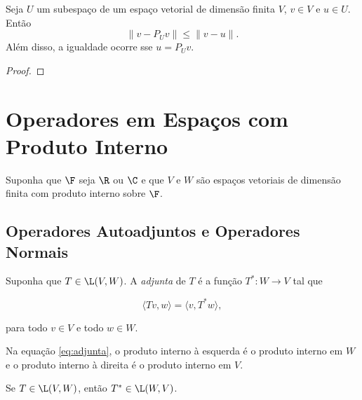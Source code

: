 \documentclass{article}
\begin{document}
\begin{prop} 
    Seja \(U\) um subespaço de um espaço vetorial de dimensão finita \(V\), \(v \in V\) e \(u \in U\). Então 
    \begin{equation}
        \| v - P_U v \| \leq \| v - u \|.
    \end{equation}
    Além disso, a igualdade ocorre sse \(u = P_U v\).
\end{prop}

\begin{proof}
    
\end{proof}

\section{Operadores em Espaços com Produto Interno}

Suponha que \(\F\) seja \(\R\) ou \(\C\) e que \(V\) e \(W\) são espaços vetoriais de dimensão finita com produto interno sobre \(\F\).

\subsection{Operadores Autoadjuntos e Operadores Normais}

\begin{defn}
    Suponha que \(T \in \L(V, W)\). A \emph{adjunta} de \(T\) é a função \(T^*: W \to V\) tal que

    \begin{equation} \label{eq:adjunta}
        \langle Tv, w \rangle = \langle v, T^* w \rangle,
    \end{equation}

    \noindent para todo \(v \in V\) e todo \(w \in W\).
\end{defn}

\begin{rem}
    Na equação \eqref{eq:adjunta}, o produto interno à esquerda é o produto interno em \(W\) e o produto interno à direita é o produto interno em \(V\).
\end{rem}

\begin{prop}
    Se \(T \in \L(V, W)\), então \(T^* \in \L(W, V)\).
\end{prop}
\end{document}
